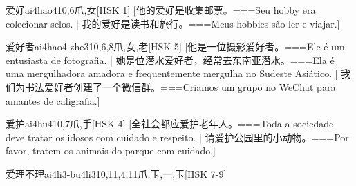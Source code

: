 \begin{EntryWithPhonetic}{爱好}{ai4hao4}{10,6}{⽖,⼥}[HSK 1]
  [他的爱好是收集邮票。===Seu hobby era colecionar selos.  | 我的爱好是读书和旅行。===Meus hobbies são ler e viajar.]
\end{EntryWithPhonetic}

\begin{EntryWithPhonetic}{爱好者}{ai4hao4 zhe3}{10,6,8}{⽖,⼥,⽼}[HSK 5]
  [他是一位摄影爱好者。===Ele é um entusiasta de fotografia. | 她是位潜水爱好者，经常去东南亚潜水。===Ela é uma mergulhadora amadora e frequentemente mergulha no Sudeste Asiático.  | 我们为书法爱好者创建了一个微信群。===Criamos um grupo no WeChat para amantes de caligrafia.]
\end{EntryWithPhonetic}

\begin{EntryWithPhonetic}{爱护}{ai4hu4}{10,7}{⽖,⼿}[HSK 4]
  [全社会都应爱护老年人。===Toda a sociedade deve tratar os idosos com cuidado e respeito. | 请爱护公园里的小动物。===Por favor, tratem os animais do parque com cuidado.]
\end{EntryWithPhonetic}

\begin{EntryWithPhonetic}{爱理不理}{ai4li3-bu4li3}{10,11,4,11}{⽖,⽟,⼀,⽟}[HSK 7-9]
\end{EntryWithPhonetic}

